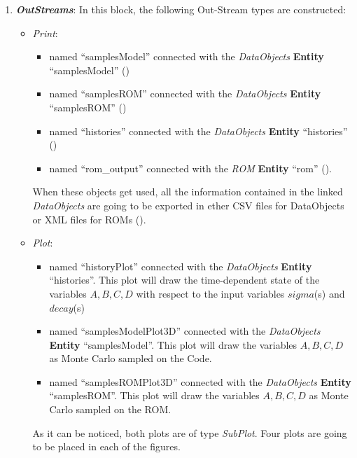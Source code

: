 \begin{enumerate}
   \item \textbf{\textit{OutStreams}}:
  In this block, the following Out-Stream types are constructed:
  \begin{itemize}
    \item \textit{Print}:
     \begin{itemize}
       \item named ``samplesModel'' connected with the \textit{DataObjects} \textbf{Entity} ``samplesModel''
                ()
       \item named ``samplesROM'' connected with the \textit{DataObjects} \textbf{Entity} ``samplesROM''
                ()
       \item named ``histories'' connected with the \textit{DataObjects} \textbf{Entity} ``histories'' ()
       \item named ``rom\_output'' connected with the \textit{ROM} \textbf{Entity} ``rom'' ().
     \end{itemize}
      When these objects get used, all the information contained in the
      linked  \textit{DataObjects} are going
    to be exported in ether CSV files for DataObjects or XML files for ROMs ().
    \item \textit{Plot}:
    \begin{itemize}
      \item named ``historyPlot'' connected with the  \textit{DataObjects}
      \textbf{Entity} ``histories''.  This plot will draw the time-dependent state of the
      variables $A,B,C,D$ with respect to the input variables $sigma$(s)
      and $decay$(s)
      \item named ``samplesModelPlot3D'' connected with the
      \textit{DataObjects} \textbf{Entity} ``samplesModel''. This plot will draw the
      variables $A,B,C,D$ as Monte Carlo sampled on the Code.
      \item named ``samplesROMPlot3D'' connected with the
      \textit{DataObjects} \textbf{Entity} ``samplesROM''. This plot will draw the
      variables $A,B,C,D$ as Monte Carlo sampled on the ROM.
    \end{itemize}
     As it can be noticed, both plots are of type \textit{SubPlot}. Four plots
     are going to be placed in each of the figures.

\end{itemize}
\end{enumerate}
